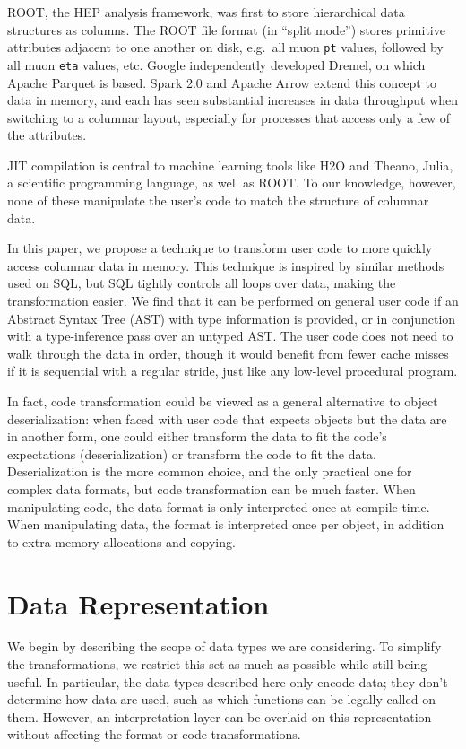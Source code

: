 \documentclass[10pt, conference, compsocconf]{IEEEtran}
\begin{document}
ROOT\cite{root}, the HEP analysis framework, was first to store hierarchical data structures as columns. The ROOT file format (in ``split mode'') stores primitive attributes adjacent to one another on disk, e.g.\ all muon {\tt pt} values, followed by all muon {\tt eta} values, etc. Google independently developed Dremel\cite{dremel}, on which Apache Parquet is based. Spark 2.0 and Apache Arrow extend this concept to data in memory, and each has seen substantial increases in data throughput when switching to a columnar layout, especially for processes that access only a few of the attributes.

JIT compilation is central to machine learning tools like H2O\cite{h2o} and Theano\cite{theano}, Julia\cite{julia}, a scientific programming language, as well as ROOT. To our knowledge, however, none of these manipulate the user's code to match the structure of columnar data.

In this paper, we propose a technique to transform user code to more quickly access columnar data in memory. This technique is inspired by similar methods used on SQL, but SQL tightly controls all loops over data, making the transformation easier. We find that it can be performed on general user code if an Abstract Syntax Tree (AST) with type information is provided, or in conjunction with a type-inference pass over an untyped AST. The user code does not need to walk through the data in order, though it would benefit from fewer cache misses if it is sequential with a regular stride, just like any low-level procedural program.

In fact, code transformation could be viewed as a general alternative to object deserialization: when faced with user code that expects objects but the data are in another form, one could either transform the data to fit the code's expectations (deserialization) or transform the code to fit the data. Deserialization is the more common choice, and the only practical one for complex data formats, but code transformation can be much faster. When manipulating code, the data format is only interpreted once at compile-time. When manipulating data, the format is interpreted once per object, in addition to extra memory allocations and copying.

\section{Data Representation}

We begin by describing the scope of data types we are considering. To simplify the transformations, we restrict this set as much as possible while still being useful. In particular, the data types described here only encode data; they don't determine how data are used, such as which functions can be legally called on them. However, an interpretation layer can be overlaid on this representation without affecting the format or code transformations.
\end{document}
